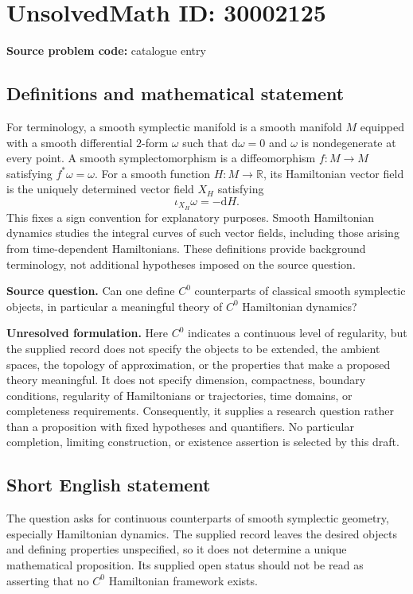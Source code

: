 \documentclass[11pt]{article}
\newcommand{\R}{\mathbb{R}}
\begin{document}
\section*{UnsolvedMath ID: 30002125}
\textbf{Source problem code:} catalogue entry
\subsection{Definitions and mathematical statement}
For terminology, a smooth symplectic manifold is a smooth manifold \(M\) equipped with a smooth differential \(2\)-form \(\omega\) such that \(\mathrm d\omega=0\) and \(\omega\) is nondegenerate at every point. A smooth symplectomorphism is a diffeomorphism \(f\colon M\to M\) satisfying \(f^*\omega=\omega\). For a smooth function \(H\colon M\to\R\), its Hamiltonian vector field is the uniquely determined vector field \(X_H\) satisfying
\[
\iota_{X_H}\omega=-\mathrm dH.
\]
This fixes a sign convention for explanatory purposes. Smooth Hamiltonian dynamics studies the integral curves of such vector fields, including those arising from time-dependent Hamiltonians. These definitions provide background terminology, not additional hypotheses imposed on the source question.

\textbf{Source question.} Can one define \(C^0\) counterparts of classical smooth symplectic objects, in particular a meaningful theory of \(C^0\) Hamiltonian dynamics?

\textbf{Unresolved formulation.} Here \(C^0\) indicates a continuous level of regularity, but the supplied record does not specify the objects to be extended, the ambient spaces, the topology of approximation, or the properties that make a proposed theory meaningful. It does not specify dimension, compactness, boundary conditions, regularity of Hamiltonians or trajectories, time domains, or completeness requirements. Consequently, it supplies a research question rather than a proposition with fixed hypotheses and quantifiers. No particular completion, limiting construction, or existence assertion is selected by this draft.
\subsection{Short English statement}
The question asks for continuous counterparts of smooth symplectic geometry, especially Hamiltonian dynamics. The supplied record leaves the desired objects and defining properties unspecified, so it does not determine a unique mathematical proposition. Its supplied open status should not be read as asserting that no \(C^0\) Hamiltonian framework exists.
\end{document}
